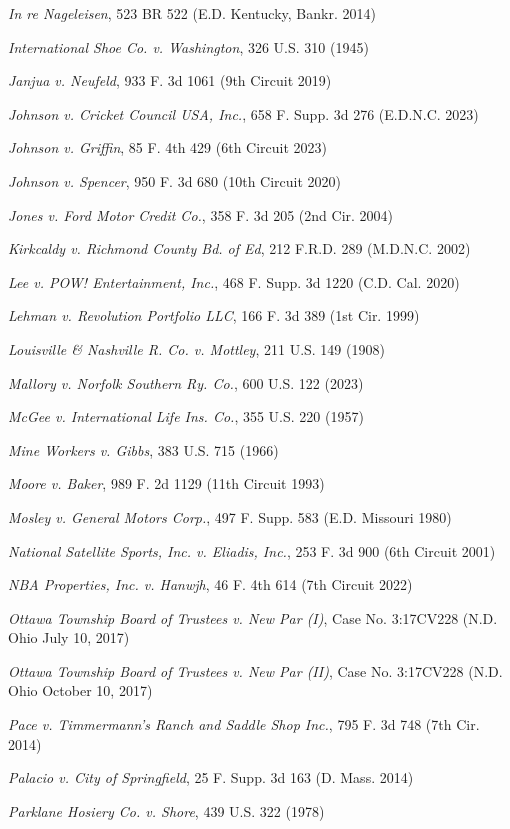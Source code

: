 \textit{In re Nageleisen}, 523 BR 522 (E.D. Kentucky, Bankr. 2014)

\textit{International Shoe Co. v. Washington}, 326 U.S. 310 (1945)

\textit{Janjua v. Neufeld}, 933 F. 3d 1061 (9th Circuit 2019)

\textit{Johnson v. Cricket Council USA, Inc.}, 658 F. Supp. 3d 276 (E.D.N.C. 2023)

\textit{Johnson v. Griffin}, 85 F. 4th 429 (6th Circuit 2023)

\textit{Johnson v. Spencer}, 950 F. 3d 680 (10th Circuit 2020)

\textit{Jones v. Ford Motor Credit Co.}, 358 F. 3d 205 (2nd Cir. 2004)

\textit{Kirkcaldy v. Richmond County Bd. of Ed}, 212 F.R.D. 289 (M.D.N.C. 2002)

\textit{Lee v. POW! Entertainment, Inc.}, 468 F. Supp. 3d 1220 (C.D. Cal. 2020)

\textit{Lehman v. Revolution Portfolio LLC}, 166 F. 3d 389 (1st Cir. 1999)

\textit{Louisville \& Nashville R. Co. v. Mottley}, 211 U.S. 149 (1908)

\textit{Mallory v. Norfolk Southern Ry. Co.}, 600 U.S. 122 (2023)

\textit{McGee v. International Life Ins. Co.}, 355 U.S. 220 (1957)

\textit{Mine Workers v. Gibbs}, 383 U.S. 715 (1966)

\textit{Moore v. Baker}, 989 F. 2d 1129 (11th Circuit 1993)

\textit{Mosley v. General Motors Corp.}, 497 F. Supp. 583 (E.D. Missouri 1980)

\textit{National Satellite Sports, Inc. v. Eliadis, Inc.}, 253 F. 3d 900 (6th Circuit 2001)

\textit{NBA Properties, Inc. v. Hanwjh}, 46 F. 4th 614 (7th Circuit 2022)

\textit{Ottawa Township Board of Trustees v. New Par (I)}, Case No. 3:17CV228 (N.D. Ohio July 10, 2017)

\textit{Ottawa Township Board of Trustees v. New Par (II)}, Case No. 3:17CV228 (N.D. Ohio October 10, 2017)

\textit{Pace v. Timmermann’s Ranch and Saddle Shop Inc.}, 795 F. 3d 748 (7th Cir. 2014)

\textit{Palacio v. City of Springfield}, 25 F. Supp. 3d 163 (D. Mass. 2014)

\textit{Parklane Hosiery Co. v. Shore}, 439 U.S. 322 (1978)

